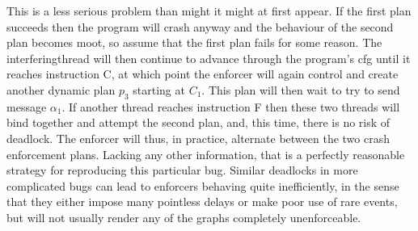 This is a less serious problem than might it might at first appear.
If the first plan succeeds then the program will crash anyway and the
behaviour of the second plan becomes moot, so assume that the first
plan fails for some reason.  The \gls{interferingthread} will then
continue to advance through the program's \gls{cfg} until it reaches
instruction C, at which point the enforcer will again control and
create another dynamic plan $p_3$ starting at $C_1$.  This plan will
then wait to try to send message $\alpha_1$.  If another thread
reaches instruction F then these two threads will bind together and
attempt the second plan, and, this time, there is no risk of deadlock.
The enforcer will thus, in practice, alternate between the two crash
enforcement plans.  Lacking any other information, that is a perfectly
reasonable strategy for reproducing this particular bug.  Similar
deadlocks in more complicated bugs can lead to enforcers behaving
quite inefficiently, in the sense that they either impose many
pointless delays or make poor use of rare events, but will not usually
render any of the graphs completely unenforceable.

